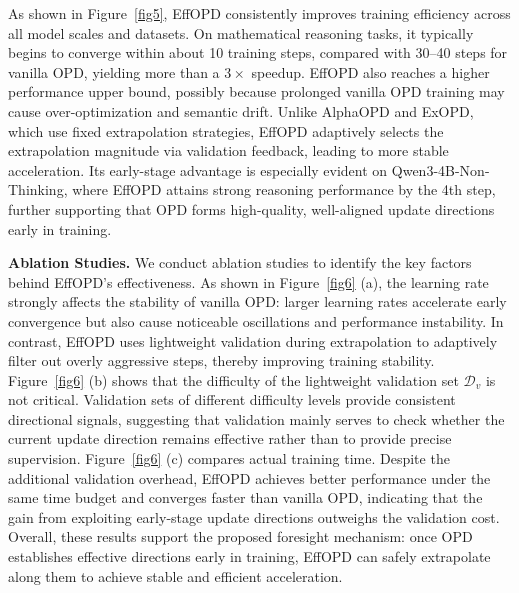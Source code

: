 \documentclass{article}
\begin{document}
As shown in Figure~\ref{fig5}, EffOPD consistently improves training efficiency across all model scales and datasets. On mathematical reasoning tasks, it typically begins to converge within about 10 training steps, compared with 30--40 steps for vanilla OPD, yielding more than a $3\times$ speedup. EffOPD also reaches a higher performance upper bound, possibly because prolonged vanilla OPD training may cause over-optimization and semantic drift. Unlike AlphaOPD and ExOPD, which use fixed extrapolation strategies, EffOPD adaptively selects the extrapolation magnitude via validation feedback, leading to more stable acceleration. Its early-stage advantage is especially evident on Qwen3-4B-Non-Thinking, where EffOPD attains strong reasoning performance by the 4th step, further supporting that OPD forms high-quality, well-aligned update directions early in training.

\textbf{Ablation Studies.}
We conduct ablation studies to identify the key factors behind EffOPD's effectiveness. As shown in Figure~\ref{fig6} (a), the learning rate strongly affects the stability of vanilla OPD: larger learning rates accelerate early convergence but also cause noticeable oscillations and performance instability. In contrast, EffOPD uses lightweight validation during extrapolation to adaptively filter out overly aggressive steps, thereby improving training stability. Figure~\ref{fig6} (b) shows that the difficulty of the lightweight validation set $\mathcal{D}_v$ is not critical. Validation sets of different difficulty levels provide consistent directional signals, suggesting that validation mainly serves to check whether the current update direction remains effective rather than to provide precise supervision. Figure~\ref{fig6} (c) compares actual training time. Despite the additional validation overhead, EffOPD achieves better performance under the same time budget and converges faster than vanilla OPD, indicating that the gain from exploiting early-stage update directions outweighs the validation cost. Overall, these results support the proposed foresight mechanism: once OPD establishes effective directions early in training, EffOPD can safely extrapolate along them to achieve stable and efficient acceleration.
\end{document}
